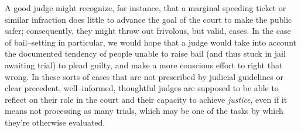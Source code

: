 
A good judge might recognize, for instance, that a marginal speeding ticket or similar infraction does little to advance the goal of the court to make the public safer; consequently, they might throw out frivolous, but valid, cases.
In the case of bail--setting in particular, we would hope that a judge would take into account the documented tendency of people unable to raise bail (and thus stuck in jail awaiting trial) to plead guilty, and make a more conscious effort to right that wrong.
In these sorts of cases that are not prescribed by judicial guidelines or clear precedent, well--informed, thoughtful judges are supposed to be able to reflect on their role in the court and their capacity to achieve \textit{justice},
even if it means not processing as many trials, which may be one of the tasks by which they're otherwise evaluated.









